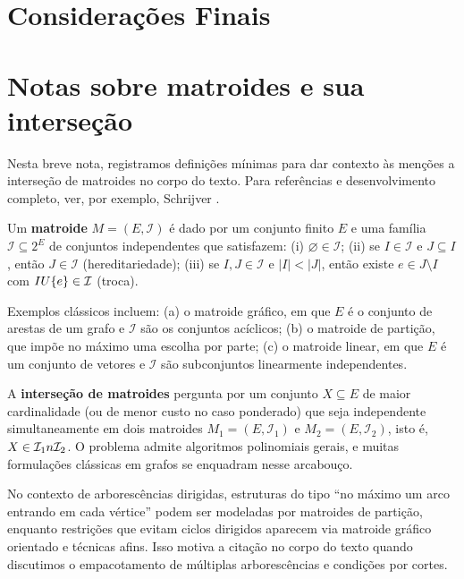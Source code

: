 \documentclass[12pt,a4paper]{article}
\def\emph#1{#1}%
\def\cup{\string U}%
\def\cap{\string n}%
\begin{document}
\section{Considerações Finais}
\clearpage
\appendix

\section{Notas sobre matroides e sua interseção}
\label{ap:matroides}
Nesta breve nota, registramos definições mínimas para dar contexto às menções a interseção de matroides no corpo do texto. Para referências e desenvolvimento completo, ver, por exemplo, Schrijver \cite{schrijver2003comb}.

Um \textbf{matroide} $M=(E,\mathcal{I})$ é dado por um conjunto finito $E$ e uma família $\mathcal{I}\subseteq 2^{E}$ de conjuntos \emph{independentes} que satisfazem: (i) $\varnothing\in\mathcal{I}$; (ii) se $I\in\mathcal{I}$ e $J\subseteq I$, então $J\in\mathcal{I}$ (hereditariedade); (iii) se $I,J\in\mathcal{I}$ e $|I|<|J|$, então existe $e\in J\setminus I$ com $I\cup\{e\}\in\mathcal{I}$ (troca).

Exemplos clássicos incluem: (a) o matroide gráfico, em que $E$ é o conjunto de arestas de um grafo e $\mathcal{I}$ são os conjuntos acíclicos; (b) o matroide de partição, que impõe no máximo uma escolha por parte; (c) o matroide linear, em que $E$ é um conjunto de vetores e $\mathcal{I}$ são subconjuntos linearmente independentes.

A \textbf{interseção de matroides} pergunta por um conjunto $X\subseteq E$ de maior cardinalidade (ou de menor custo no caso ponderado) que seja independente simultaneamente em dois matroides $M_1=(E,\mathcal{I}_1)$ e $M_2=(E,\mathcal{I}_2)$, isto é, $X\in\mathcal{I}_1\cap\mathcal{I}_2$. O problema admite algoritmos polinomiais gerais, e muitas formulações clássicas em grafos se enquadram nesse arcabouço.

No contexto de arborescências dirigidas, estruturas do tipo “no máximo um arco entrando em cada vértice” podem ser modeladas por matroides de partição, enquanto restrições que evitam ciclos dirigidos aparecem via matroide gráfico orientado e técnicas afins. Isso motiva a citação no corpo do texto quando discutimos o empacotamento de múltiplas arborescências e condições por cortes.




\bigskip
\printbibliography
\end{document}
